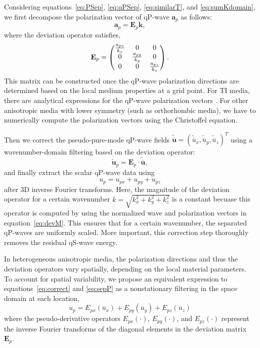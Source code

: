 Considering equations~\ref{eq:PSep}, \ref{eq:qPSep}, \ref{eq:similarT}, and \ref{eq:sumKdomain}, we
first decompose the polarization vector of qP-wave $\mathbf{a}_{p}$ 
 as follows:
\begin{equation}
\label{eq:polDemp}
\mathbf{a}_{p}=\mathbf{E}_{p}\mathbf{k},
\end{equation}
where the deviation operator satisfies,
\begin{equation}
\label{eq:devM}
\mathbf{E}_{p}=
\begin{pmatrix}\frac{a_{px}}{k_{x}} &0 &0 \cr
          0 & \frac{a_{py}}{k_{y}} &0 \cr
          0 & 0 & \frac{a_{pz}}{k_{z}}\end{pmatrix}. 
\end{equation}
This matrix can be constructed once the qP-wave polarization directions
are determined based on the local medium properties at a grid point.
For TI media, there are analytical expressions for the qP-wave polarization vectors \cite[]{dellinger.thesis}. 
For other anisotropic media with lower symmetry (such as orthorhombic media), we have to numerically compute
the polarization vectors using the Christoffel equation. 

Then we correct the pseudo-pure-mode qP-wave fields
 $\widetilde{\overline{\mathbf{u}}}=(\widetilde{\overline{u}}_{x},
 \widetilde{\overline{u}}_{y}, \widetilde{\overline{u}}_{z})^{T}$ using a wavenumber-domain filtering
based on the deviation operator:
\begin{equation} 
\label{eq:correct}
\widetilde{\mathbf{u}}_{p}=\mathbf{E}_{p}\cdot{\widetilde{\overline{\mathbf{u}}}},
\end{equation}
and finally extract the scalar qP-wave data using
\begin{equation}
\label{eq:sepP}
u_{p}=u_{px}+u_{py}+u_{pz}
\end{equation}
after 3D inverse Fourier transforms. 
Here, the magnitude of the deviation operator for a certain wavenumber $k=\sqrt{k^2_{x}+k^2_{y}+k^2_{z}}$ is a constant becuase
this operator is computed by using the normalized wave and polarization vectors in equation~\ref{eq:devM}. This ensures that
for a certain wavenumber, the separated qP-waves are uniformly scaled. More important, this correction step thoroughly
removes the residual qS-wave energy.

In heterogeneous anisotropic media, the polarization directions and thus the deviation operators vary
 spatially, depending on the local material parameters. To account for spatial variability,
 we propose an equivalent expression to equations~\ref{eq:correct} and \ref{eq:sepP} as a nonstationary filtering 
 in the space domain at each location,
\begin{equation}
u_{p}=E_{px}(\overline{u}_{x})+E_{py}(\overline{u}_{y})+E_{pz}(\overline{u}_{z})
\end{equation}
where the pseudo-derivative operators $E_{px}(\cdot)$, $E_{py}(\cdot)$, and $E_{pz}(\cdot)$ represent
 the inverse Fourier transforms of the diagonal elements in the deviation matrix $\mathbf{E}_{p}$.

